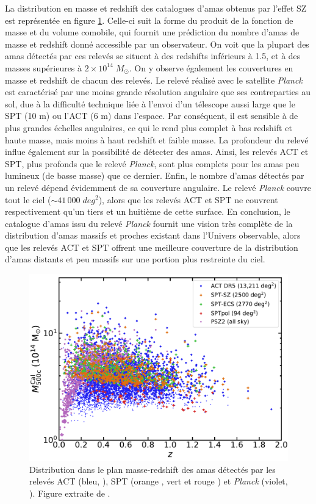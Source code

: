 La distribution en masse et redshift des catalogues d'amas obtenus par l'effet SZ est représentée en figure \ref{fig:cluster_catalogs_mz}.
Celle-ci suit la forme du produit de la fonction de masse et du volume comobile, qui fournit une prédiction du nombre d'amas de masse et redshift donné accessible par un observateur\footnotemark.
On voit que la plupart des amas détectés par ces relevés se situent à des redshifts inférieurs à 1.5, et à des masses supérieures à $2 \times 10^{14} \;M_\odot$.
On y observe également les couvertures en masse et redshift de chacun des relevés.
Le relevé réalisé avec le satellite \textit{Planck} est caractérisé par une moins grande résolution angulaire que ses contreparties au sol, due à la difficulté technique liée à l'envoi d'un télescope aussi large que le SPT (10 m) ou l'ACT (6 m) dans l'espace.
Par conséquent, il est sensible à de plus grandes échelles angulaires, ce qui le rend plus complet à bas redshift et haute masse, mais moins à haut redshift et faible masse.
La profondeur du relevé influe également sur la possibilité de détecter des amas.
Ainsi, les relevés ACT et SPT, plus profonds que le relevé \textit{Planck}, sont plus complets pour les amas peu lumineux (de basse masse) que ce dernier.
Enfin, le nombre d'amas détectés par un relevé dépend évidemment de sa couverture angulaire.
Le relevé \textit{Planck} couvre tout le ciel ($\sim 41\,000 \;\unit{deg^2}$), alors que les relevés ACT et SPT ne couvrent respectivement qu'un tiers et un huitième de cette surface.
En conclusion, le catalogue d'amas issu du relevé \textit{Planck} fournit une vision très complète de la distribution d'amas massifs et proches existant dans l'Univers observable, alors que les relevés ACT et SPT offrent une meilleure couverture de la distribution d'amas distants et peu massifs sur une portion plus restreinte du ciel.

\begin{figure}[t]
    \centering
    \includegraphics[width=.6\textwidth]{Figures/Chap_amas/mz_sz.pdf}
    \caption{
        Distribution dans le plan masse-redshift des amas détectés par les relevés ACT (bleu, \cite{hilton_atacama_2021}), SPT (orange \cite{bleem_galaxy_2015}, vert \cite{bleem_sptpol_2020} et rouge \cite{huang_galaxy_2020}) et \textit{Planck} (violet, \cite{planck_collaboration_planck_2016-2}).
        Figure extraite de \cite{hilton_atacama_2021}.
    }
    \label{fig:cluster_catalogs_mz}
\end{figure}

